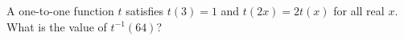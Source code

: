 A one-to-one function $t$ satisfies $t(3)=1$ and $t(2x)=2t(x)$ for all real $x$. What is the value of $t^{-1}(64)$?
